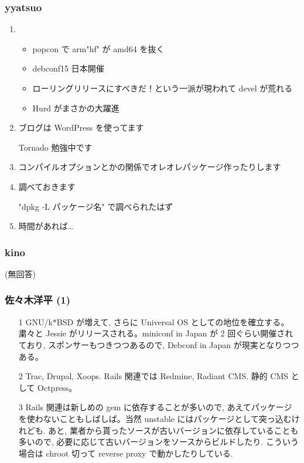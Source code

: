 \documentclass[cjk,dvipdfmx,10pt,compress,%
hyperref={bookmarks=true,bookmarksnumbered=true,bookmarksopen=false,%
colorlinks=false,%
pdftitle={第 68 回 関西 Debian 勉強会},%
pdfauthor={倉敷・のがた・佐々木・かわだ},%
pdfsubject={資料},%
}]{beamer}
\begin{document}
\begin{frame}
  \frametitle{ yyatsuo }
  \begin{enumerate}
  \item
    \begin{itemize}
    \item popcon で arm"hf" が amd64 を抜く
    \item debconf15 日本開催
    \item ローリングリリースにすべきだ！という一派が現われて devel が荒れる
    \item Hurd がまさかの大躍進
    \end{itemize}
  \item ブログは WordPress を使ってます

    Tornado 勉強中です
  \item コンパイルオプションとかの関係でオレオレパッケージ作ったりします
  \item 調べておきます

    "dpkg -L パッケージ名" で調べられたはず
  \item 時間があれば…
  \end{enumerate}
\end{frame}

\begin{frame}
  \frametitle{ kino }

(無回答)

\end{frame}

\begin{frame}
  \frametitle{ 佐々木洋平 (1)}
  \begin{enumerate}
  \item[1] GNU/k$*$BSD が増えて, さらに Universal OS としての地位を確立する。粛々と Jessie がリリースされる。miniconf in Japan が 2 回ぐらい開催されており, スポンサーもつきつつあるので, Debconf in Japan が現実となりつつある。
  \item[2] Trac, Drupal, Xoops. Rails 関連では Redmine, Radiant CMS. 静的 CMS として Octpress。
  \item[3] Rails 関連は新しめの gem に依存することが多いので, あえてパッケージを使わないこともしばしば。当然 unstable にはパッケージとして突っ込むけれども. あと, 業者から貰ったソースが古いバージョンに依存していることも多いので, 必要に応じて古いバージョンをソースからビルドしたり. こういう場合は chroot 切って reverse proxy で動かしたりしている.
  \end{enumerate}
\end{frame}
\end{document}
